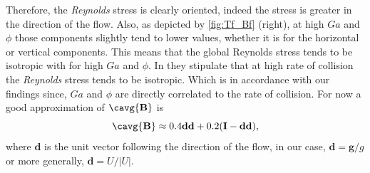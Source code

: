 Therefore, the \textit{Reynolds} stress is clearly oriented, indeed the stress is greater in the direction of the flow. 
Also, as depicted by \ref{fig:Tf_Bf} (right), at high $Ga$ and $\phi$ those components slightly tend to lower values, whether it is for the horizontal or vertical components. 
This means that the global Reynolds stress tends to be isotropic with for high $Ga$ and $\phi$. 
In \citet{jackson2000dynamics} they stipulate that at high rate of collision the \textit{Reynolds} stress tends to be isotropic. 
Which is in accordance with our findings since, $Ga$ and $\phi$ are directly correlated to the rate of collision. 
For now a good approximation of $\cavg{\textbf{B}}$ is 
\begin{equation}
    \cavg{\textbf{B}} 
    \approx 0.4 \textbf{dd} + 0.2 (\textbf{I} - \textbf{dd}),
    \label{eq:Bf_scaling}
\end{equation}
where $\textbf{d}$ is the unit vector following the direction of the flow, in our case, $\textbf{d} = \textbf{g}/g$ or more generally, $\textbf{d} = U/|U|$. 

